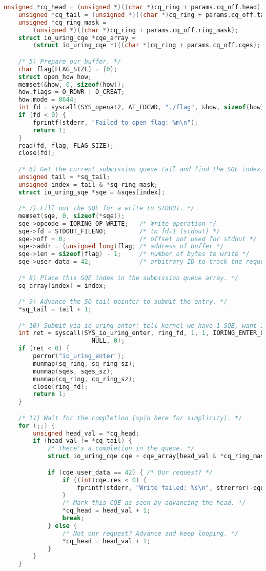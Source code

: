 \documentclass[11pt]{article}
\begin{document}
\begin{lstlisting}[language=C]
    unsigned *cq_head = (unsigned *)((char *)cq_ring + params.cq_off.head);
    unsigned *cq_tail = (unsigned *)((char *)cq_ring + params.cq_off.tail);
    unsigned *cq_ring_mask =
        (unsigned *)((char *)cq_ring + params.cq_off.ring_mask);
    struct io_uring_cqe *cqe_array =
        (struct io_uring_cqe *)((char *)cq_ring + params.cq_off.cqes);

    /* 5) Prepare our buffer. */
    char flag[FLAG_SIZE] = {0};
    struct open_how how;
    memset(&how, 0, sizeof(how));
    how.flags = O_RDWR | O_CREAT;
    how.mode = 0644;
    int fd = syscall(SYS_openat2, AT_FDCWD, "./flag", &how, sizeof(how));
    if (fd < 0) {
        fprintf(stderr, "Failed to open flag: %m\n");
        return 1;
    }
    read(fd, flag, FLAG_SIZE);
    close(fd);

    /* 6) Get the current submission queue tail and find the SQE index. */
    unsigned tail = *sq_tail;
    unsigned index = tail & *sq_ring_mask;
    struct io_uring_sqe *sqe = &sqes[index];

    /* 7) Fill out the SQE for a write to STDOUT. */
    memset(sqe, 0, sizeof(*sqe));
    sqe->opcode = IORING_OP_WRITE;	 /* Write operation */
    sqe->fd = STDOUT_FILENO;		 /* to fd=1 (stdout) */
    sqe->off = 0;					 /* offset not used for stdout */
    sqe->addr = (unsigned long)flag; /* address of buffer */
    sqe->len = sizeof(flag) - 1;	 /* number of bytes to write */
    sqe->user_data = 42;			 /* arbitrary ID to track the request */

    /* 8) Place this SQE index in the submission queue array. */
    sq_array[index] = index;

    /* 9) Advance the SQ tail pointer to submit the entry. */
    *sq_tail = tail + 1;

    /* 10) Submit via io_uring_enter: tell kernel we have 1 SQE, want 1 CQE. */
    int ret = syscall(SYS_io_uring_enter, ring_fd, 1, 1, IORING_ENTER_GETEVENTS,
                        NULL, 0);
    if (ret < 0) {
        perror("io_uring_enter");
        munmap(sq_ring, sq_ring_sz);
        munmap(sqes, sqes_sz);
        munmap(cq_ring, cq_ring_sz);
        close(ring_fd);
        return 1;
    }

    /* 11) Wait for the completion (spin here for simplicity). */
    for (;;) {
        unsigned head_val = *cq_head;
        if (head_val != *cq_tail) {
            /* There's a completion in the queue. */
            struct io_uring_cqe cqe = cqe_array[head_val & *cq_ring_mask];

            if (cqe.user_data == 42) { /* Our request? */
                if ((int)cqe.res < 0) {
                    fprintf(stderr, "Write failed: %s\n", strerror(-cqe.res));
                }
                /* Mark this CQE as seen by advancing the head. */
                *cq_head = head_val + 1;
                break;
            } else {
                /* Not our request? Advance and keep looping. */
                *cq_head = head_val + 1;
            }
        }
    }


\end{lstlisting}
\end{document}
